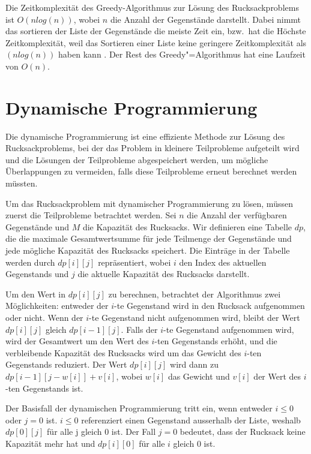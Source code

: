 Die Zeitkomplexität des Greedy-Algorithmus zur Lösung des 
Rucksackproblems ist $O(nlog(n))$, 
wobei $n$ die Anzahl der Gegenstände darstellt. Dabei nimmt das 
sortieren der Liste der Gegenstände die meiste Zeit ein, bzw.\ hat 
die Höchste Zeitkomplexität, weil das Sortieren einer Liste 
keine geringere Zeitkomplexität als $(nlog(n))$ haben kann 
. Der Rest des Greedy"=Algorithmus hat eine 
Laufzeit von $O(n)$.\ \cite[vgl.]{cormen2022introduction}

\section{Dynamische Programmierung}
Die dynamische Programmierung ist eine effiziente Methode zur 
Lösung des Rucksackproblems, bei der das Problem in kleinere 
Teilprobleme aufgeteilt wird und die Lösungen der Teilprobleme 
abgespeichert werden, um mögliche Überlappungen zu vermeiden, falls 
diese Teilprobleme erneut berechnet werden müssten.

Um das Rucksackproblem mit dynamischer Programmierung zu 
lösen, müssen zuerst die Teilprobleme betrachtet werden. Sei $n$ die 
Anzahl der verfügbaren Gegenstände und $M$ die Kapazität des 
Rucksacks. Wir definieren eine Tabelle $dp$, die die maximale 
Gesamtwertsumme für jede Teilmenge der Gegenstände und jede 
mögliche Kapazität des Rucksacks speichert. Die Einträge in 
der Tabelle werden durch $dp[i][j]$ repräsentiert, wobei $i$ den 
Index des aktuellen Gegenstands und $j$ die aktuelle Kapazität 
des Rucksacks darstellt.

Um den Wert in $dp[i][j]$ zu berechnen, betrachtet der Algorithmus 
zwei Möglichkeiten: entweder der $i$-te Gegenstand wird in den 
Rucksack aufgenommen oder nicht. Wenn der $i$-te Gegenstand 
nicht aufgenommen wird, bleibt der Wert $dp[i][j]$ gleich 
$dp[i-1][j]$. Falls der $i$-te Gegenstand aufgenommen wird, wird 
der Gesamtwert um den Wert des $i$-ten Gegenstands erhöht, und 
die verbleibende Kapazität des Rucksacks wird um das Gewicht 
des $i$-ten Gegenstands reduziert. Der Wert $dp[i][j]$ wird dann 
zu $dp[i-1][j-w[i]] + v[i]$, wobei $w[i]$ das Gewicht und $v[i]$ 
der Wert des $i$-ten Gegenstands ist.

Der Basisfall der dynamischen Programmierung tritt ein, wenn 
entweder $i \le 0$ oder $j = 0$ ist. $i \le 0$ referenziert einen 
Gegenstand ausserhalb der Liste, weshalb $dp[0][j]$ für alle j gleich 0 ist. 
Der Fall $j = 0$ bedeutet, 
dass der Rucksack keine Kapazität mehr hat und $dp[i][0]$ 
für alle $i$ gleich $0$ ist.

